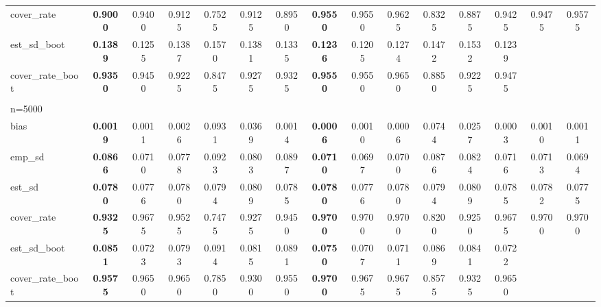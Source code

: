 \documentclass[11pt]{article}
\numberwithin{equation}{section}
\begin{document}
\begin{table}[]
{\begin{tabular}{lcccccccccccccc}
			cover\_rate & \textbf{0.9000} & 0.9400 & 0.9125 & 0.7525 & 0.9125 & 0.8950 & \textbf{0.9550} & 0.9550 & 0.9625 & 0.8325 & 0.8875 & 0.9425 & 0.9475 & 0.9575 \\
			est\_sd\_boot & \textbf{0.1389} & 0.1255 & 0.1387 & 0.1570 & 0.1381 & 0.1335 & \textbf{0.1236} & 0.1205 & 0.1274 & 0.1472 & 0.1532 & 0.1239 &  &  \\
			cover\_rate\_boot & \textbf{0.9350} & 0.9450 & 0.9225 & 0.8475 & 0.9275 & 0.9325 & \textbf{0.9550} & 0.9550 & 0.9650 & 0.8850 & 0.9225 & 0.9475 &  &  \\
			\\
			n=5000 &  &  &  &  &  &  &  &  &  &  &  &  &  &  \\
			\hline
			bias & \textbf{0.0019} & 0.0011 & 0.0026 & 0.0931 & 0.0369 & 0.0014 & \textbf{0.0006} & 0.0010 & 0.0006 & 0.0744 & 0.0257 & 0.0003 & 0.0010 & 0.0011 \\
			emp\_sd & \textbf{0.0866} & 0.0710 & 0.0778 & 0.0923 & 0.0803 & 0.0897 & \textbf{0.0710} & 0.0697 & 0.0700 & 0.0876 & 0.0824 & 0.0716 & 0.0713 & 0.0694 \\
			est\_sd & \textbf{0.0780} & 0.0776 & 0.0780 & 0.0794 & 0.0809 & 0.0785 & \textbf{0.0780} & 0.0776 & 0.0780 & 0.0794 & 0.0809 & 0.0785 & 0.0782 & 0.0775 \\
			cover\_rate & \textbf{0.9325} & 0.9675 & 0.9525 & 0.7475 & 0.9275 & 0.9450 & \textbf{0.9700} & 0.9700 & 0.9700 & 0.8200 & 0.9250 & 0.9675 & 0.9700 & 0.9700 \\
			est\_sd\_boot & \textbf{0.0851} & 0.0723 & 0.0793 & 0.0914 & 0.0815 & 0.0891 & \textbf{0.0750} & 0.0707 & 0.0711 & 0.0869 & 0.0841 & 0.0722 &  &  \\
			cover\_rate\_boot & \textbf{0.9575} & 0.9650 & 0.9650 & 0.7850 & 0.9300 & 0.9550 & \textbf{0.9700} & 0.9675 & 0.9675 & 0.8575 & 0.9325 & 0.9650 &  &\\
			\hline
		\end{tabular}
		\label{tab:simu_average_att_p5_2}}
\end{table}
\end{document}
